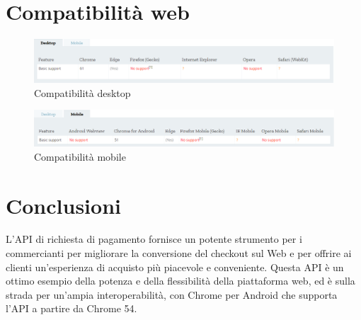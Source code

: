 \documentclass[italian]{article}
\begin{document}
	\section{Compatibilità web}
	\pagebreak
		\begin{figure}
			\centering
			\includegraphics[width=1\linewidth]{Compatibilita1}
			\caption{Compatibilità desktop}
			\label{fig: Compatibilità desktop}
		\end{figure}
		\begin{figure}
			\centering
			\includegraphics[width=1\linewidth]{Compatibilita2}
			\caption{Compatibilità mobile}
			\label{fig: Compatibilità mobile}
		\end{figure}
	\section{Conclusioni}
	L'API di richiesta di pagamento fornisce un potente strumento per i commercianti per migliorare la conversione del checkout sul Web e per offrire ai clienti un'esperienza di acquisto più piacevole e conveniente. Questa API è un ottimo esempio della potenza e della flessibilità della piattaforma web, ed è sulla strada per un'ampia interoperabilità, con Chrome per Android che supporta l'API a partire da Chrome 54.
\end{document}
